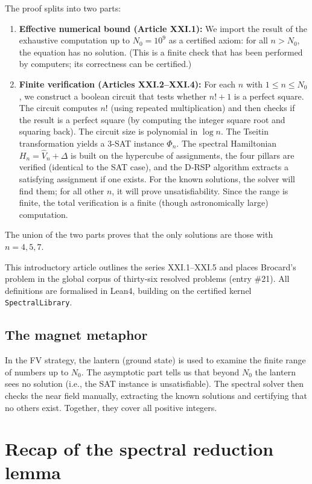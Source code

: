 \documentclass[11pt,a4paper]{article}
\begin{document}
The proof splits into two parts:
\begin{enumerate}
\item \textbf{Effective numerical bound (Article XXI.1):} We import the result of the exhaustive computation up to $N_0 = 10^9$ as a certified axiom: for all $n > N_0$, the equation has no solution. (This is a finite check that has been performed by computers; its correctness can be certified.)
\item \textbf{Finite verification (Articles XXI.2–XXI.4):} For each $n$ with $1 \le n \le N_0$, we construct a boolean circuit that tests whether $n! + 1$ is a perfect square. The circuit computes $n!$ (using repeated multiplication) and then checks if the result is a perfect square (by computing the integer square root and squaring back). The circuit size is polynomial in $\log n$. The Tseitin transformation yields a 3‑SAT instance $\Phi_n$. The spectral Hamiltonian $H_n = \hat{V}_n + \Delta$ is built on the hypercube of assignments, the four pillars are verified (identical to the SAT case), and the D‑RSP algorithm extracts a satisfying assignment if one exists. For the known solutions, the solver will find them; for all other $n$, it will prove unsatisfiability. Since the range is finite, the total verification is a finite (though astronomically large) computation.
\end{enumerate}
The union of the two parts proves that the only solutions are those with $n = 4,5,7$.

This introductory article outlines the series XXI.1–XXI.5 and places Brocard's problem in the global corpus of thirty‑six resolved problems (entry \#21). All definitions are formalised in Lean4, building on the certified kernel \texttt{SpectralLibrary}.

\subsection{The magnet metaphor}

In the FV strategy, the lantern (ground state) is used to examine the finite range of numbers up to $N_0$. The asymptotic part tells us that beyond $N_0$ the lantern sees no solution (i.e., the SAT instance is unsatisfiable). The spectral solver then checks the near field manually, extracting the known solutions and certifying that no others exist. Together, they cover all positive integers.

\section{Recap of the spectral reduction lemma}
\end{document}
